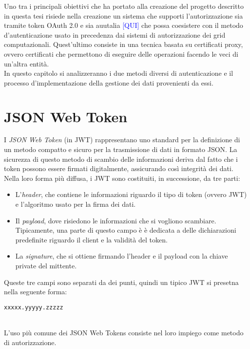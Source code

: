 Uno tra i principali obiettivi che ha portato alla creazione del progetto descritto in questa tesi 
risiede nella creazione un sistema che supporti 
l'autorizzazione sia tramite token OAuth 2.0 e sia auutalia \textcolor{blue}{[QUI]} che possa coesistere con il metodo d'autenticazione usato in precedenza dai sistemi di autorizzazione dei grid computazionali.  
Quest'ultimo consiste in una tecnica basata su certificati proxy, ovvero certificati che permettono di eseguire delle operazioni facendo le veci di un'altra entità. 
\\ In questo capitolo si analizzeranno i due metodi diversi di autenticazione e il processo d'implementazione della gestione 
dei dati provenienti da essi.

\section{JSON Web Token}
I \textit{JSON Web Token} (in JWT) rappresentano uno standard per la definizione di un metodo 
compatto e sicuro per la trasmissione di dati in formato JSON. La sicurezza di questo metodo di scambio delle 
informazioni deriva dal fatto che i token possono essere firmati digitalmente, assicurando così integrità dei dati.  
\\ Nella loro forma più diffusa, i JWT sono costituiti, in successione, da tre parti:
\begin{itemize}
    \item L'\textit{header}, che contiene le informazioni riguardo il tipo di token (ovvero JWT) e 
    l'algoritmo usato per la firma dei dati. 
    \item Il \textit{payload}, dove risiedono le informazioni che si vogliono scambiare. Tipicamente, una parte di questo campo è 
    è dedicata a delle dichiarazioni predefinite riguardo il client e la validità del token. 
    \item La \textit{signature}, che si ottiene firmando l'header e il payload con la chiave private del mittente.
\end{itemize}
Queste tre campi sono separati da dei punti, quindi un tipico JWT si presetna nella seguente forma:
\\ \centerline{\texttt{xxxxx.yyyyy.zzzzz}}
\\ L'uso più comune dei JSON Web Tokens consiste nel loro impiego come metodo di autorizzazione.

